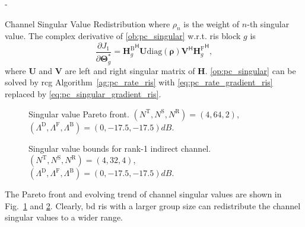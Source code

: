 \documentclass[journal]{IEEEtran}
\begin{document}
\begin{section}{-}
\begin{subsection}{Channel Singular Value Redistribution}
		where $\rho_n$ is the weight of $n$-th singular value.
		The complex derivative of \eqref{ob:pc_singular} w.r.t. \gls{ris} block $g$ is
		\begin{equation}
			\frac{\partial J_1}{\partial \mathbf{\Theta}_g^*} = {\mathbf{H}_g^\mathrm{B}}^\mathsf{H} \mathbf{U} \mathrm{diag}(\boldsymbol{\rho}) \mathbf{V}^\mathsf{H} {\mathbf{H}_g^\mathrm{F}}^\mathsf{H},
			\label{eq:pc_singular_gradient_ris}
		\end{equation}
		where $\mathbf{U}$ and $\mathbf{V}$ are left and right singular matrix of $\mathbf{H}$.
		\eqref{op:pc_singular} can be solved by \gls{rcg} Algorithm~\ref{ag:pc_rate_ris} with \eqref{eq:pc_rate_gradient_ris} replaced by \eqref{eq:pc_singular_gradient_ris}.

		\begin{figure}[!t]
			\centering
			\resizebox{0.65\columnwidth}{!}{
				
			}
			\caption{Singular value Pareto front. $(N^\mathrm{T}, N^\mathrm{S}, N^\mathrm{R}) = (4, 64, 2)$, $(\Lambda^\mathrm{D}, \Lambda^\mathrm{F}, \Lambda^\mathrm{B}) = (0, -17.5, -17.5) \unit{dB}$.}
			\label{sm:pc_singular_pareto}
		\end{figure}

		\begin{figure}[!t]
			\centering
			\resizebox{0.65\columnwidth}{!}{
				
			}
			\caption{Singular value bounds for rank-1 indirect channel. $(N^\mathrm{T}, N^\mathrm{S}, N^\mathrm{R}) = (4, 32, 4)$, $(\Lambda^\mathrm{D}, \Lambda^\mathrm{F}, \Lambda^\mathrm{B}) = (0, -17.5, -17.5) \unit{dB}$.}
			\label{sm:pc_singular_bound}
		\end{figure}

		The Pareto front and evolving trend of channel singular values are shown in Fig.~\ref{sm:pc_singular_pareto} and \ref{sm:pc_singular_bound}.
		Clearly, \gls{bd} \gls{ris} with a larger group size can redistribute the channel singular values to a wider range.
	\end{subsection}
\end{section}
\end{document}
